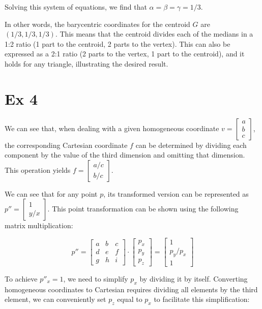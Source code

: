 \documentclass{article}
\begin{document}
Solving this system of equations, we find that $\alpha = \beta = \gamma = 1/3$.

In other words, the barycentric coordinates for the centroid $G$ are $\left(1/3, 1/3, 1/3\right)$. This means that the centroid divides each of the medians in a 1:2 ratio (1 part to the centroid, 2 parts to the vertex). This can also be expressed as a 2:1 ratio (2 parts to the vertex, 1 part to the centroid), and it holds for any triangle, illustrating the desired result.





\cleardoublepage
\section*{Ex 4}
We can see that, when dealing with a given homogeneous coordinate $v = \begin{bmatrix} a \\ b \\ c \end{bmatrix}$, the corresponding Cartesian coordinate $f$ can be determined by dividing each component by the value of the third dimension and omitting that dimension. This operation yields $f = \begin{bmatrix} a/c \\ b/c \end{bmatrix}$.

We can see that for any point $p$, its transformed version can be represented as $p'' = \begin{bmatrix} 1 \\ y/x \end{bmatrix}$. This point transformation can be shown using the following matrix multiplication:

\[
    p'' = \begin{bmatrix} a & b & c \\ d & e & f \\ g & h & i \end{bmatrix} \cdot \begin{bmatrix} p_x \\ p_y \\ p_z \end{bmatrix} = \begin{bmatrix} 1 \\ p_y/p_x \\ 1 \end{bmatrix}
\]

To achieve $p''_x = 1$, we need to simplify $p_x$ by dividing it by itself. Converting homogeneous coordinates to Cartesian requires dividing all elements by the third element, we can conveniently set $p_z$ equal to $p_x$ to facilitate this simplification:
\end{document}
